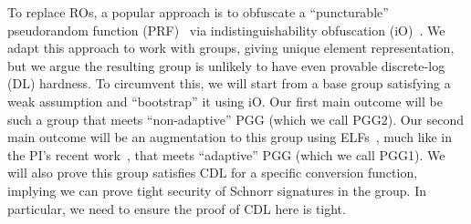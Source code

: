 
To replace ROs, a popular approach is to obfuscate a ``puncturable'' pseudorandom function (PRF)~\cite{STOC:SahWat14} via  indistinguishability obfuscation (iO)~\cite{DBLP:journals/jacm/BarakGIRSVY12,FOCs:GGHRSW13,JACM:JaiLinSai24}. We adapt this   approach to work with groups, giving unique element representation,  but we argue the resulting group is unlikely to have even provable discrete-log (DL) hardness. To circumvent this, we will start from a base group satisfying a weak assumption and  ``bootstrap'' it using iO.  Our first main outcome will be such a group that meets ``non-adaptive'' PGG (which we call PGG2).  Our second main outcome will be an augmentation to this group using  ELFs~\cite{C:Zhandry16}, much like in the PI's recent work~\cite{AC:MurONeZah22}, that meets ``adaptive'' PGG (which we call PGG1). We will also prove this group satisfies CDL for a specific conversion function,  implying we can prove tight security of Schnorr signatures in the group. In particular,  we need to ensure the proof of CDL here is tight.  %
\fi


